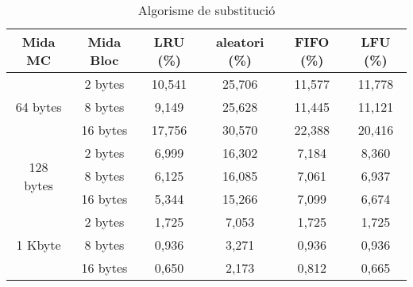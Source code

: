 \documentclass{article}
\begin{document}
\begin{table}[!h]
\centering
\begin{tabular}{|c|c|c|c|c|c|}
\hline
Mida MC & Mida Bloc & LRU (\%) & aleatori (\%) & FIFO (\%) & LFU (\%) \\
\hline
\multirow{3}{4em}{64 bytes}     & 2 bytes                        & 10,541                        & 25,706                             & 11,577                         & 11,778                        \\
                              & 8 bytes                        & 9,149                         & 25,628                             & 11,445                         & 11,121                        \\
                              & 16 bytes                       & 17,756                        & 30,570                             & 22,388                         & 20,416                        \\
\hline
\multirow{3}{4em}{128 bytes}    & 2 bytes                        & 6,999                         & 16,302                             & 7,184                          & 8,360                         \\
                              & 8 bytes                        & 6,125                         & 16,085                             & 7,061                          & 6,937                         \\
                              & 16 bytes                       & 5,344                         & 15,266                             & 7,099                          & 6,674                         \\
\hline
\multirow{3}{4em}{1 Kbyte}      & 2 bytes                        & 1,725                         & 7,053                              & 1,725                          & 1,725                         \\
                              & 8 bytes                        & 0,936                         & 3,271                              & 0,936                          & 0,936                         \\
                              & 16 bytes                       & 0,650                         & 2,173                              & 0,812                          & 0,665                        
\\
\hline
\end{tabular}
\caption{Algorisme de substitució}
\label{tab:sub}
\end{table}
\end{document}
